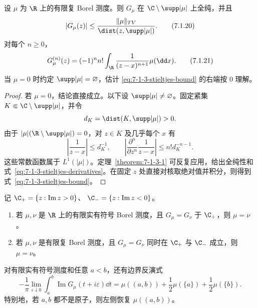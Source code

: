 \begin{proposition}\label{proposition:7-1-3-2}
设 $\mu$ 为 $\R$ 上的有限复 Borel 测度。则 $G_\mu$ 在
$\C\setminus\supp|\mu|$ 上全纯，并且
\[
 |G_\mu(z)|
 \le\frac{\|\mu\|_{TV}}{\dist(z,\supp|\mu|)}.
 \tag{7.1.20}\label{eq:7-1-3-stieltjes-bound}
\]
对每个 $n\ge0$，
\[
 G_\mu^{(n)}(z)
 =(-1)^nn!\int_\R\frac1{(z-x)^{n+1}}\mu(\dd x).
 \tag{7.1.21}\label{eq:7-1-3-stieltjes-derivatives}
\]
当 $\mu=0$ 时约定 $\supp|\mu|=\varnothing$，估计
\eqref{eq:7-1-3-stieltjes-bound} 的右端按 $0$ 理解。
\end{proposition}

\begin{proof}
若 $\mu=0$，结论直接成立。以下设 $\supp|\mu|\ne\varnothing$。固定紧集
$K\Subset\C\setminus\supp|\mu|$，并令
\[
 d_K=\dist(K,\supp|\mu|)>0.
\]
由于 $|\mu|(\R\setminus\supp|\mu|)=0$，对 $z\in K$ 及几乎每个 $x$ 有
\[
 \left|\frac1{z-x}\right|\le d_K^{-1},
 \qquad
 \left|\frac{\partial^n}{\partial z^n}\frac1{z-x}\right|
 \le n!d_K^{-n-1}.
\]
这些常数函数属于 $L^1(|\mu|)$。定理~\ref{theorem:7-1-3-1} 可反复应用，给出全纯性和
式~\eqref{eq:7-1-3-stieltjes-derivatives}。在固定 $z$ 处直接对核取绝对值并积分，则得到
式~\eqref{eq:7-1-3-stieltjes-bound}。
\end{proof}

\begin{theorem}\label{theorem:7-1-3-3}
记 $\C_+=\{z:\operatorname{Im}z>0\}$、
$\C_-=\{z:\operatorname{Im}z<0\}$。
\begin{enumerate}
  \item 若 $\mu,\nu$ 是 $\R$ 上的有限实有符号 Borel 测度，且
        $G_\mu=G_\nu$ 于 $\C_+$，则 $\mu=\nu$。
  \item 若 $\mu,\nu$ 是有限复 Borel 测度，且
        $G_\mu=G_\nu$ 同时在 $\C_+$ 与 $\C_-$ 成立，则 $\mu=\nu$。
\end{enumerate}
对有限实有符号测度和任意 $a<b$，还有边界反演式
\[
 -\frac1\pi\lim_{\varepsilon\downarrow0}
 \int_a^b\operatorname{Im}G_\mu(t+i\varepsilon)\dd t
 =\mu((a,b))+\frac12\mu(\{a\})+\frac12\mu(\{b\}).
 \tag{7.1.22}\label{eq:7-1-3-stieltjes-inversion}
\]
特别地，若 $a,b$ 都不是原子，则左侧恢复 $\mu((a,b))$。
\end{theorem}

